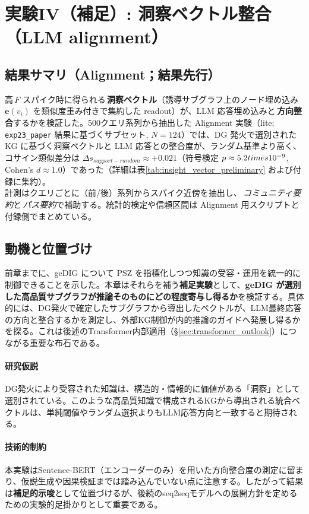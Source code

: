 \documentclass[ja=standard,xelatex]{bxjsarticle}
\begin{document}
\section{実験IV（補足）: 洞察ベクトル整合（LLM alignment）}

\subsection{結果サマリ（Alignment；結果先行）}
高\,\mbox{$F$} スパイク時に得られる\,\textbf{洞察ベクトル}（誘導サブグラフ上のノード埋め込み $\mathbf{e}(v_i)$ を類似度重み付きで集約した readout）が、LLM 応答埋め込みと\,\textbf{方向整合}するかを検証した。500クエリ系列から抽出した Alignment 実験（lite; \texttt{exp23\_paper} 結果に基づくサブセット, $N{=}124$）では、DG 発火で選別された KG に基づく洞察ベクトルと LLM 応答との整合度が、ランダム基準より高く、コサイン類似差分は $\Delta s_{support-random}\approx+0.021$（符号検定 $p\approx5.2\\times10^{-9}$, Cohen's $d\approx1.0$）であった（詳細は表\ref{tab:insight_vector_preliminary} および付録に集約）。\\
\noindent 計測はクエリごとに（前/後）系列からスパイク近傍を抽出し、\,\emph{コミュニティ要約}と\,\emph{パス要約}で補助する。統計的検定や信頼区間は Alignment 用スクリプトと付録側でまとめている。

\subsection{動機と位置づけ}

前章までに、geDIG について PSZ を指標化しつつ知識の受容・運用を統一的に制御できることを示した。本章はそれらを補う\textbf{補足実験}として、\textbf{geDIG が選別した高品質サブグラフが推論そのものにどの程度寄与し得るか}を検証する。具体的には、DG発火で確定したサブグラフから導出したベクトルが、LLM最終応答の方向と整合するかを測定し、外部KG制御が内的推論のガイドへ発展し得るかを探る。これは後述のTransformer内部適用（\S\ref{sec:transformer_outlook}）につながる重要な布石である。

\paragraph{研究仮説}
DG発火により受容された知識は、構造的・情報的に価値がある「洞察」として選別されている。このような高品質知識で構成されるKGから導出される統合ベクトルは、単純閾値やランダム選択よりもLLM応答方向と一致すると期待される。

\paragraph{技術的制約}
本実験はSentence-BERT（エンコーダーのみ）を用いた方向整合度の測定に留まり、仮説生成や因果検証までは踏み込んでいない点に注意する。したがって結果は\textbf{補足的示唆}として位置づけるが、後続のseq2seqモデルへの展開方針を定めるための実験的足掛かりとして重要である。
\end{document}

